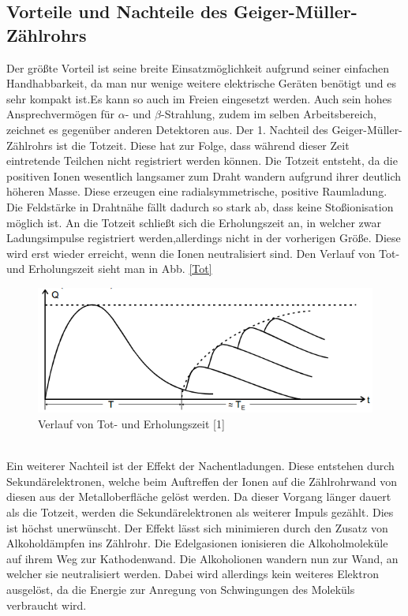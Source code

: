 \subsection{Vorteile und Nachteile des Geiger-Müller-Zählrohrs}
Der größte Vorteil ist seine breite Einsatzmöglichkeit aufgrund seiner einfachen Handhabbarkeit, da man nur wenige weitere elektrische Geräten benötigt und es sehr kompakt ist.Es kann so auch im Freien eingesetzt werden.
Auch sein hohes Ansprechvermögen für $\alpha$- und $\beta$-Strahlung, zudem im selben Arbeitsbereich, zeichnet es gegenüber anderen Detektoren aus.
Der 1. Nachteil des Geiger-Müller-Zählrohrs ist die Totzeit. Diese hat zur Folge, dass während dieser Zeit eintretende Teilchen nicht registriert werden können.
Die Totzeit entsteht, da die positiven Ionen wesentlich langsamer zum Draht wandern aufgrund ihrer deutlich höheren Masse. Diese erzeugen eine radialsymmetrische, positive Raumladung. Die Feldstärke in Drahtnähe fällt dadurch so stark ab, dass keine Stoßionisation möglich ist. An die Totzeit schließt sich die Erholungszeit an, in welcher zwar Ladungsimpulse registriert werden,allerdings nicht in der vorherigen Größe. Diese wird erst wieder erreicht, wenn die Ionen neutralisiert sind. Den Verlauf von Tot- und Erholungszeit sieht man in Abb. \eqref{Tot} 
	\begin{figure}[h]
		\begin{center}
		\includegraphics[scale=0.8]{Totzeit.png}
		\caption{Verlauf von Tot- und Erholungszeit [1]}
		\label{Tot}
		\end{center}	
	\end{figure} \\
Ein weiterer Nachteil ist der Effekt der Nachentladungen. Diese entstehen durch Sekundärelektronen, welche beim Auftreffen der Ionen auf die Zählrohrwand von diesen aus der Metalloberfläche gelöst werden. Da dieser Vorgang länger dauert als die Totzeit, werden die Sekundärelektronen als weiterer Impuls gezählt. Dies ist höchst unerwünscht. Der Effekt lässt sich minimieren durch den Zusatz von Alkoholdämpfen ins Zählrohr. Die Edelgasionen ionisieren die Alkoholmoleküle auf ihrem Weg zur Kathodenwand. Die Alkoholionen wandern nun zur Wand, an welcher sie neutralisiert werden. Dabei wird allerdings kein weiteres Elektron ausgelöst, da die Energie zur Anregung von Schwingungen des Moleküls verbraucht wird.
